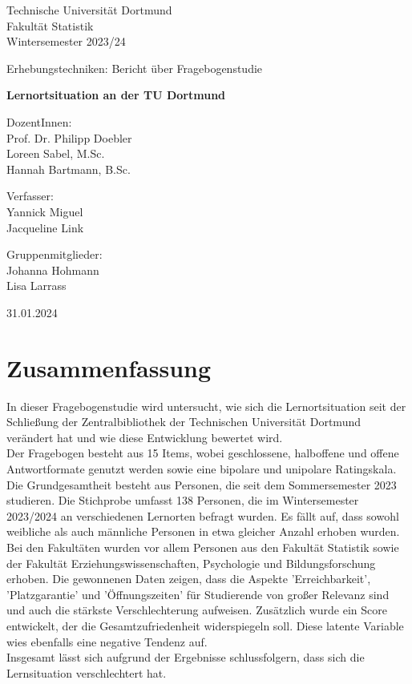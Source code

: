 \documentclass[11pt, a4paper]{article}
\begin{document}
\thispagestyle{empty}

\begin{center}
	\Large
	Technische Universität Dortmund\\
	Fakultät Statistik\\
	Wintersemester 2023/24\\
	
	\vspace{6em}
	
	Erhebungstechniken: Bericht über Fragebogenstudie
	
	\Huge
	\textbf{Lernortsituation an der TU Dortmund}
	
	\Large
	\vspace{4em}
	DozentInnen:	\\Prof. Dr. Philipp Doebler \\Loreen Sabel, M.Sc.\\Hannah Bartmann, B.Sc.


	\vspace{6em}
	Verfasser: \\
	Yannick Miguel \\Jacqueline Link
	
	\vspace{6em}
	Gruppenmitglieder:\\
	Johanna Hohmann\\
	Lisa Larrass
	
    \vspace{6em}
    
	31.01.2024
\end{center}

\newpage \null\thispagestyle{empty}\newpage
\tableofcontents
\newpage\null\thispagestyle{empty}\newpage
\section*{Zusammenfassung}
In dieser Fragebogenstudie wird untersucht, wie sich die Lernortsituation seit der Schließung der Zentralbibliothek der Technischen Universität Dortmund verändert hat und wie diese Entwicklung bewertet wird.\\
Der Fragebogen besteht aus 15 Items, wobei geschlossene, halboffene und offene Antwortformate genutzt werden sowie eine bipolare und unipolare Ratingskala. \\
Die Grundgesamtheit besteht aus Personen, die seit dem Sommersemester 2023 studieren. Die Stichprobe umfasst 138 Personen, die im Wintersemester 2023/2024 an verschiedenen Lernorten befragt wurden.
Es fällt auf, dass sowohl weibliche als auch männliche Personen in etwa gleicher Anzahl erhoben wurden. Bei den Fakultäten wurden vor allem Personen aus den Fakultät Statistik sowie der Fakultät Erziehungswissenschaften, Psychologie und Bildungsforschung erhoben.
Die gewonnenen Daten zeigen, dass die Aspekte 'Erreichbarkeit',  'Platzgarantie' und 'Öffnungszeiten' für Studierende von großer Relevanz sind und auch die stärkste Verschlechterung aufweisen. Zusätzlich wurde ein Score entwickelt, der die Gesamtzufriedenheit widerspiegeln soll. Diese latente Variable wies ebenfalls eine negative Tendenz auf.\\
Insgesamt lässt sich aufgrund der Ergebnisse schlussfolgern, dass sich die Lernsituation verschlechtert hat.
\end{document}
